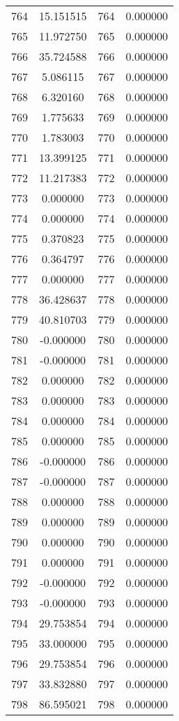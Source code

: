 \documentclass[12pt]{article}
\begin{document}
\begin{longtable}{@{}cccc@{}}
764 & 15.151515 & 764 & 0.000000 \\
765 & 11.972750 & 765 & 0.000000 \\
766 & 35.724588 & 766 & 0.000000 \\
767 & 5.086115 & 767 & 0.000000 \\
768 & 6.320160 & 768 & 0.000000 \\
769 & 1.775633 & 769 & 0.000000 \\
770 & 1.783003 & 770 & 0.000000 \\
771 & 13.399125 & 771 & 0.000000 \\
772 & 11.217383 & 772 & 0.000000 \\
773 & 0.000000 & 773 & 0.000000 \\
774 & 0.000000 & 774 & 0.000000 \\
775 & 0.370823 & 775 & 0.000000 \\
776 & 0.364797 & 776 & 0.000000 \\
777 & 0.000000 & 777 & 0.000000 \\
778 & 36.428637 & 778 & 0.000000 \\
779 & 40.810703 & 779 & 0.000000 \\
780 & -0.000000 & 780 & 0.000000 \\
781 & -0.000000 & 781 & 0.000000 \\
782 & 0.000000 & 782 & 0.000000 \\
783 & 0.000000 & 783 & 0.000000 \\
784 & 0.000000 & 784 & 0.000000 \\
785 & 0.000000 & 785 & 0.000000 \\
786 & -0.000000 & 786 & 0.000000 \\
787 & -0.000000 & 787 & 0.000000 \\
788 & 0.000000 & 788 & 0.000000 \\
789 & 0.000000 & 789 & 0.000000 \\
790 & 0.000000 & 790 & 0.000000 \\
791 & 0.000000 & 791 & 0.000000 \\
792 & -0.000000 & 792 & 0.000000 \\
793 & -0.000000 & 793 & 0.000000 \\
794 & 29.753854 & 794 & 0.000000 \\
795 & 33.000000 & 795 & 0.000000 \\
796 & 29.753854 & 796 & 0.000000 \\
797 & 33.832880 & 797 & 0.000000 \\
798 & 86.595021 & 798 & 0.000000 \\

\end{longtable}
\end{document}
